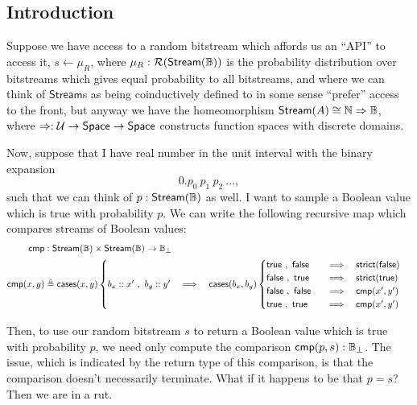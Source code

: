 \newcommand{\Stream}{\mathsf{Stream}}
\newcommand{\Prob}{\mathcal{R}}

\subsection{Introduction}

Suppose we have access to a random bitstream which affords us an ``API'' to access it, $s \leftarrow \mu_R$, where $\mu_R : \Prob(\Stream(\bool))$ is the probability distribution over bitstreams which gives equal probability to all bitstreams, and where we can think of $\Stream$s as being coinductively defined to in some sense ``prefer'' access to the front, but anyway we have the homeomorphism $\Stream(A) \cong \nat \Rightarrow \bool$, where $\Rightarrow : \mathcal{U} \to \mathsf{Space} \to \mathsf{Space}$ constructs function spaces with discrete domains.

Now, suppose that I have real number in the unit interval with the binary expansion
\[
0. p_0\ p_1\ p_2\ \ldots,
\]
such that we can think of $p : \Stream(\bool)$ as well. I want to sample a Boolean value which is true with probability $p$. We can write the following recursive map which compares streams of Boolean values:
\begin{align*}
\mathsf{cmp} &: \Stream(\bool) \times \Stream(\bool) \to \bool_\bot
\\ \mathsf{cmp}(x, y) &\triangleq \mathsf{cases}(x, y)
\begin{cases}
b_x :: x'\ ,\ b_y :: y'
\quad \Longrightarrow \quad
\mathsf{cases}(b_x, b_y)
  \begin{cases}
  \mathsf{true}\ ,\ \mathsf{false} \quad &\Longrightarrow \quad
    \mathsf{strict}(\mathsf{false})
    \\
    \mathsf{false}\ ,\ \mathsf{true} \quad &\Longrightarrow \quad
    \mathsf{strict}(\mathsf{true})
    \\
    \mathsf{false}\ ,\ \mathsf{false} \quad &\Longrightarrow \quad
    \mathsf{cmp}(x', y')
    \\
    \mathsf{true}\ ,\ \mathsf{true} \quad &\Longrightarrow \quad
    \mathsf{cmp}(x', y')
  \end{cases}
\end{cases}
\end{align*}

Then, to use our random bitstream $s$ to return a Boolean value which is true with probability $p$, we need only compute the comparison $\mathsf{cmp}(p, s) : \mathbb{B}_\bot$. The issue, which is indicated by the return type of this comparison, is that the comparison doesn't necessarily terminate. What if it happens to be that $p = s$? Then we are in a rut.

